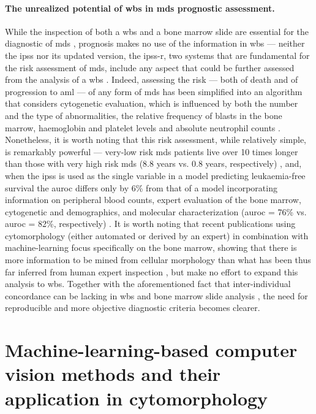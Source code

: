 \paragraph{The unrealized potential of \ac{wbs} in \ac{mds} prognostic assessment.} While the inspection of both a \ac{wbs} and a bone marrow slide are essential for the diagnostic of \ac{mds} \cite{Greenberg2012-en,Arber2016-os}, prognosis makes no use of the information in \ac{wbs} --- neither the \ac{ipss} nor its updated version, the \ac{ipss-r}, two systems that are fundamental for the risk assessment of \ac{mds}, include any aspect that could be further assessed from the analysis of a \ac{wbs} \cite{Greenberg2012-en}. Indeed, assessing the risk --- both of death and of progression to \ac{aml} --- of any form of \ac{mds} has been simplified into an algorithm that considers cytogenetic evaluation, which is influenced by both the number and the type of abnormalities, the relative frequency of blasts in the bone marrow, haemoglobin and platelet levels and absolute neutrophil counts \cite{Greenberg2012-en}. Nonetheless, it is worth noting that this risk assessment, while relatively simple, is remarkably powerful --- very-low risk \ac{mds} patients live over 10 times longer than those with very high risk \ac{mds} (8.8 years vs. 0.8 years, respectively) \cite{Greenberg2012-en}, and, when the \ac{ipss} is used as the single variable in a model predicting leukaemia-free survival the \ac{auroc} differs only by 6\% from that of a model incorporating information on peripheral blood counts, expert evaluation of the bone marrow, cytogenetic and demographics, and molecular characterization (\ac{auroc} = 76\% vs. \ac{auroc} = 82\%, respectively) \cite{Abelson}. It is worth noting that recent publications using cytomorphology (either automated or derived by an expert) in combination with machine-learning focus specifically on the bone marrow, showing that there is more information to be mined from cellular morphology than what has been thus far inferred from human expert inspection \cite{Bruck2021-fx,Nagata2020-lh}, but make no effort to expand this analysis to \ac{wbs}. Together with the aforementioned fact that inter-individual concordance can be lacking in \ac{wbs} and bone marrow slide analysis \cite{Font2013-lx, Parmentier2012-wm, Della_Porta2015-hw}, the need for reproducible and more objective diagnostic criteria becomes clearer.

\section{Machine-learning-based computer vision methods and their application in cytomorphology}

